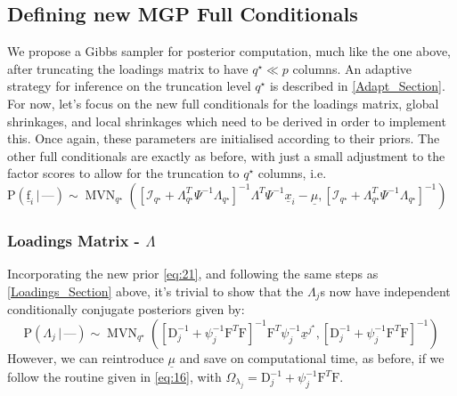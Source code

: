 \documentclass[a4paper,12pt,fleqn]{article}
\numberwithin{equation}{section}
\def\given{\,|\,}
\begin{document}
\subsection[Defining new MGP Full Conditionals]{Defining new MGP Full Conditionals}
We propose a Gibbs sampler for posterior computation, much like the one above, after truncating the loadings matrix to have $q^\star \ll p$ columns. An adaptive strategy for inference on the truncation level $q^\star$ is described in \ref{Adapt_Section}. For now, let's focus on the new full conditionals for the loadings matrix, global shrinkages, and local shrinkages which need to be derived in order to implement this. Once again, these parameters are initialised according to their priors. The other full conditionals are exactly as before, with just a small adjustment to the factor scores to allow for the truncation to $q^\star$ columns, i.e. $\mathrm{P}\left(\underline{\text{f}}_i \given \mbox{---}\right) \sim  \operatorname{MVN}_{q^\star}\left(\left[\mathcal{I}_{q^\star} + \Lambda^T_{q^\star}\Psi^{-1}\Lambda_{q^\star}\right]^{-1}\Lambda^T\Psi^{-1}\underline{x}_i - \underline{\mu},\left[\mathcal{I}_{q^\star} + \Lambda^T_{q^\star}\Psi^{-1}\Lambda_{q^\star}\right]^{-1}\right)$

\subsubsection[Loadings Matrix]{Loadings Matrix - $\Lambda$}
Incorporating the new prior \eqref{eq:21}, and following the same steps as \ref{Loadings_Section} above, it's trivial to show that the $\Lambda_j$s now have independent conditionally conjugate posteriors given by$\colon$
\begin{equation}
\mathrm{P}\left(\Lambda_j\given \mbox{---}\right) \sim \operatorname{MVN}_{q^\star}\left(\left[\mathrm{D}_j^{-1} + \psi_j^{-1}\text{F}^T\text{F}\right]^{-1}\text{F}^T\psi_j^{-1}\underline{x}^{j^\star},\left[\mathrm{D}_j^{-1} + \psi_j^{-1}\text{F}^T\text{F}\right]^{-1}\right)\label{eq:24}\end{equation}
\noindent However, we can reintroduce $\underline{\mu}$ and save on computational time, as before, if we follow the routine given in \eqref{eq:16}, with $\Omega_{\lambda_j} = \mathrm{D}_j^{-1} + \psi_j^{-1}\text{F}^T\text{F}$.
\end{document}
